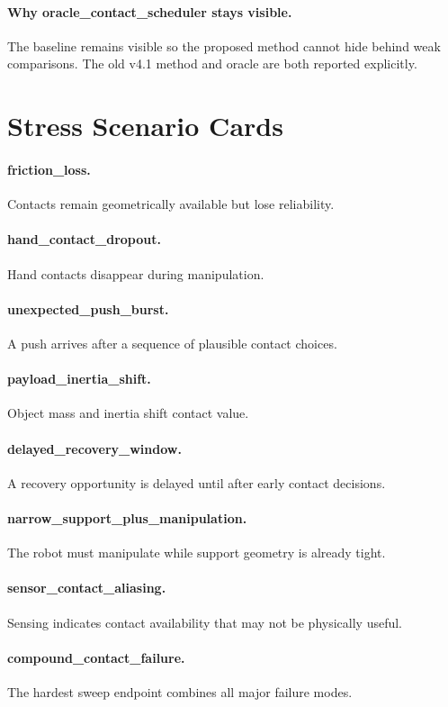 \documentclass{article}
\begin{document}
\paragraph{Why oracle\_contact\_scheduler stays visible.} The baseline remains visible so the proposed method cannot hide behind weak comparisons. The old v4.1 method and oracle are both reported explicitly.
\clearpage
\section{Stress Scenario Cards}
\paragraph{friction\_loss.} Contacts remain geometrically available but lose reliability.
\paragraph{hand\_contact\_dropout.} Hand contacts disappear during manipulation.
\paragraph{unexpected\_push\_burst.} A push arrives after a sequence of plausible contact choices.
\paragraph{payload\_inertia\_shift.} Object mass and inertia shift contact value.
\paragraph{delayed\_recovery\_window.} A recovery opportunity is delayed until after early contact decisions.
\paragraph{narrow\_support\_plus\_manipulation.} The robot must manipulate while support geometry is already tight.
\paragraph{sensor\_contact\_aliasing.} Sensing indicates contact availability that may not be physically useful.
\paragraph{compound\_contact\_failure.} The hardest sweep endpoint combines all major failure modes.
\end{document}
